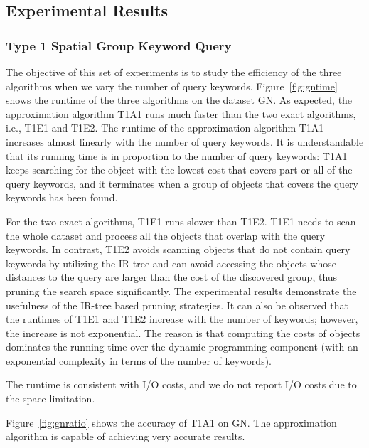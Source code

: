 \documentclass{sig-alternate}
\begin{document}
\subsection{Experimental Results}

\subsubsection{Type 1 Spatial Group Keyword Query}\label{sec:ex:type1}

 The objective of
this set of experiments is to study the efficiency of the three
algorithms when we vary the number of query keywords.
%
Figure~\ref{fig:gntime} shows the runtime of the three algorithms on
the dataset \textsf{GN}. As expected, the approximation algorithm
T1A1 runs much faster than the two exact algorithms, i.e., T1E1 and
T1E2.
%
The runtime of the approximation algorithm T1A1 increases almost
linearly with the number of query keywords. It is understandable
that its running time is in proportion to the number of query
keywords: T1A1 keeps searching for the object with the lowest cost that
covers part or all of the query keywords, and it terminates when a group
of objects that covers the query keywords has been found.

For the two exact algorithms, T1E1 runs slower than T1E2. T1E1 needs
to scan the whole dataset and process all the objects that overlap
with the query keywords. In contrast, T1E2 avoids scanning objects
that do not contain query keywords by utilizing the IR-tree and can
avoid accessing the objects whose distances to the query are larger
than the cost of the discovered group, thus pruning the search space
significantly.
%
The experimental results demonstrate the usefulness of the IR-tree
based pruning strategies.
%
It can also be observed that the runtimes of T1E1 and T1E2 increase with
the number of keywords; however, the increase is not exponential.
%
The reason is that computing the costs of objects dominates the
running time over the dynamic programming component (with an
exponential complexity in terms of the number of keywords).

The runtime is consistent with I/O costs, and we do not report I/O
costs due to the space limitation.

Figure~\ref{fig:gnratio} shows the accuracy of T1A1 on \textsf{GN}.
The approximation algorithm is capable of achieving
very accurate results.
\end{document}
